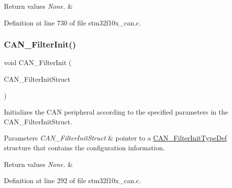 \begin{DoxyRetVals}{Return values}
{\em None.} & \\
\hline
\end{DoxyRetVals}


Definition at line 730 of file stm32f10x\+\_\+can.\+c.

\mbox{\label{group___c_a_n___private___functions_ga39476830280340363c51041be6b12647}} 
\subsubsection{\texorpdfstring{C\+A\+N\+\_\+\+Filter\+Init()}{CAN\_FilterInit()}}
{\footnotesize\ttfamily void C\+A\+N\+\_\+\+Filter\+Init (\begin{DoxyParamCaption}\item[{\hyperlink{struct_c_a_n___filter_init_type_def}{C\+A\+N\+\_\+\+Filter\+Init\+Type\+Def} $\ast$}]{C\+A\+N\+\_\+\+Filter\+Init\+Struct }\end{DoxyParamCaption})}



Initializes the C\+AN peripheral according to the specified parameters in the C\+A\+N\+\_\+\+Filter\+Init\+Struct. 


\begin{DoxyParams}{Parameters}
{\em C\+A\+N\+\_\+\+Filter\+Init\+Struct} & pointer to a \hyperlink{struct_c_a_n___filter_init_type_def}{C\+A\+N\+\_\+\+Filter\+Init\+Type\+Def} structure that contains the configuration information. \\
\hline
\end{DoxyParams}

\begin{DoxyRetVals}{Return values}
{\em None.} & \\
\hline
\end{DoxyRetVals}


Definition at line 292 of file stm32f10x\+\_\+can.\+c.

\mbox{\label{group___c_a_n___private___functions_ga2faad96caf823ef463cc5b5b25c480bb}} 
